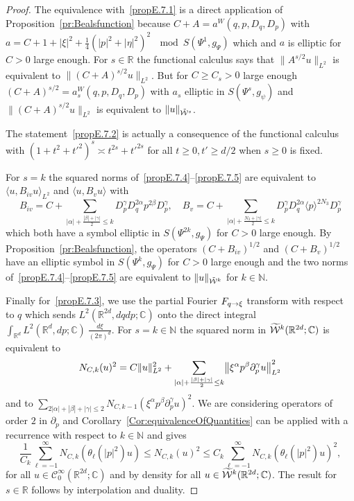 \documentclass[10pt]{amsart}
\theoremstyle{definition}\newtheorem{defi}[theo]{Definition}\newtheorem{rema}[theo]{Remark}\newtheorem{exam}[theo]{Example}\newtheorem{exem}[theo]{Example}\newtheorem{nota}[theo]{Notation}
\newcommand{\C}{\mathbb{C}}
\newcommand{\R}{\mathbb{R}}
\newcommand{\N}{\mathbb{N}}
\newcommand{\clW}{\mathcal{W}}
\newcommand{\clC}{\mathcal{C}}
\let\oldtilde\tilde
\renewcommand*{\tilde}[1]{\mathchoice{\widetilde{#1}}{\widetilde{#1}}{\oldtilde{#1}}{\oldtilde{#1}}}
\let\originalleft\left
\let\originalright\right
\renewcommand{\left}{\mathopen{}\mathclose\bgroup\originalleft}
\renewcommand{\right}{\aftergroup\egroup\originalright}
\renewcommand*{\to}{\mathchoice{\longrightarrow}{\rightarrow}{\rightarrow}{\rightarrow}}
\begin{document}
\begin{proof}
The equivalence with~\eqref{propE.7.1} is a direct application of Proposition~\ref{pr:Bealsfunction} because $C+A=a^{W}(q,p,D_{q},D_{p})$ with $a=C+1+|\xi|^{2}+\frac{1}{4}(|p|^{2}+|\eta|^{2})^{2}~\mod S(\Psi^{1},g_{\Psi})$ which and $a$ is elliptic for $C>0$ large enough. For $s\in \R$ the functional calculus says that $\|A^{s/2}u\|_{L^{2}}$ is equivalent to $\|(C+A)^{s/2}u\|_{L^{2}}$. But for $C\geq C_{s}>0$ large enough $(C+A)^{s/2}=a_{s}^{W}(q,p,D_{q},D_{p})$ with $a_{s}$ elliptic in $S(\Psi^{s},g_{\psi})$ and $\|(C+A)^{s/2}u\|_{L^{2}}$ is equivalent to $\|u\|_{\tilde{\clW}^{s}}$.

The statement~\eqref{propE.7.2} is actually a consequence of the functional calculus with $(1+t^2+{t'}^2)^{s}\asymp t^{2s}+{t'}^{2s}$ for all $t\geq 0, t'\geq d/2$ when $s\geq 0$ is fixed.

For $s=k$ the squared norms of~\eqref{propE.7.4}--\eqref{propE.7.5} are equivalent to $\langle u, B_{iv}u\rangle_{L^{2}}$ and $\langle u, B_{v}u\rangle$ with
\[
B_{iv}=C+\sum_{|\alpha|+\frac{|\beta|+|\gamma|}{2}\leq k}D_{p}^{\gamma}D_{q}^{2\alpha}p^{2\beta}D_{p}^{\gamma},\quad B_{v}=C+\sum_{|\alpha|+\frac{N_{3}+|\gamma|}{2}\leq k}D_{p}^{\gamma}D_{q}^{2\alpha}\langle p\rangle^{2N_{3}}D_{p}^{\gamma}
\]
which both have a symbol elliptic in $S(\Psi^{2k},g_{\Psi})$ for $C>0$ large enough. By Proposition~\ref{pr:Bealsfunction}, the operators $(C+B_{iv})^{1/2}$ and $(C+B_{v})^{1/2}$ have an elliptic symbol in $S(\Psi^{k},g_{\Psi})$ for $C>0$ large enough and the two norms of~\eqref{propE.7.4}--\eqref{propE.7.5} are equivalent to $\|u\|_{\tilde{\clW}^{k}}$ for $k\in \N$.

Finally for~\eqref{propE.7.3}, we use the partial Fourier $F_{q\to\xi}$ transform with respect to $q$ which sends $L^{2}(\R^{2d},dqdp;\C)$ onto the direct integral $\int_{\R^{d}}L^{2}(\R^{d},dp;\C)~\frac{d\xi}{(2\pi)^{d}}$. For $s=k\in\N$ the squared norm in $\tilde{\clW}^{k}(\R^{2d};\C)$ is equivalent to
\[
N_{C,k}(u)^{2}=C\|u\|_{L^{2}}^{2}+\sum_{|\alpha|+\frac{|\beta|+|\gamma|}{2}\leq k}\left\|\xi^{\alpha}p^{\beta}\partial_{p}^{\gamma}u\right\|_{L^{2}}^{2}
\]
and to $\sum_{2|\alpha|+|\beta|+|\gamma|\leq 2}N_{C,k-1}(\xi^{\alpha}p^{\beta}\partial_{p}^{\gamma}u)^{2}$. We are considering operators of order $2$ in $\partial_{p}$ and Corollary~\ref{Cor:equivalenceOfQuantities} can be applied with a recurrence with respect to $k\in \N$ and gives
\[
\frac{1}{C_{k}}\sum_{\ell=-1}^{\infty}N_{C,k}(\theta_{\ell}(|p|^{2})u)\leq N_{C,k}(u)^{2}\leq C_{k}\sum_{\ell=-1}^{\infty}N_{C,k}(\theta_{\ell}(|p|^{2})u)^{2},
\]
for all $u\in \clC^{\infty}_{0}(\R^{2d};\C)$ and by density for all $u\in \tilde{\clW}^{k}(\R^{2d};\C)$. The result for $s\in \R$ follows by interpolation and duality.
\end{proof}
\end{document}
